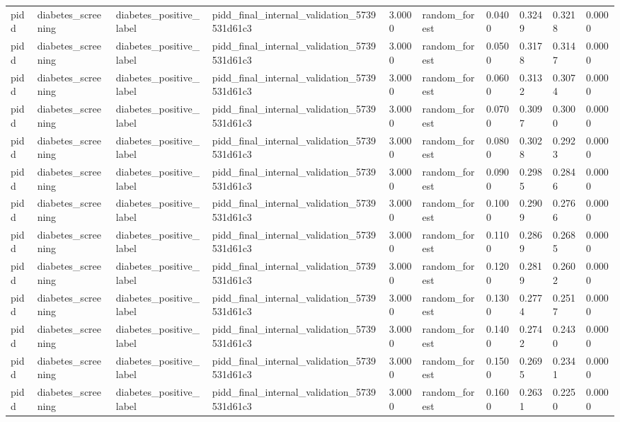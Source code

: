 \begin{tabular}{llllllllll}
pidd & diabetes\_screening & diabetes\_positive\_label & pidd\_final\_internal\_validation\_5739531d61c3 & 3.0000 & random\_forest & 0.0400 & 0.3249 & 0.3218 & 0.0000 \\
pidd & diabetes\_screening & diabetes\_positive\_label & pidd\_final\_internal\_validation\_5739531d61c3 & 3.0000 & random\_forest & 0.0500 & 0.3178 & 0.3147 & 0.0000 \\
pidd & diabetes\_screening & diabetes\_positive\_label & pidd\_final\_internal\_validation\_5739531d61c3 & 3.0000 & random\_forest & 0.0600 & 0.3132 & 0.3074 & 0.0000 \\
pidd & diabetes\_screening & diabetes\_positive\_label & pidd\_final\_internal\_validation\_5739531d61c3 & 3.0000 & random\_forest & 0.0700 & 0.3097 & 0.3000 & 0.0000 \\
pidd & diabetes\_screening & diabetes\_positive\_label & pidd\_final\_internal\_validation\_5739531d61c3 & 3.0000 & random\_forest & 0.0800 & 0.3028 & 0.2923 & 0.0000 \\
pidd & diabetes\_screening & diabetes\_positive\_label & pidd\_final\_internal\_validation\_5739531d61c3 & 3.0000 & random\_forest & 0.0900 & 0.2985 & 0.2846 & 0.0000 \\
pidd & diabetes\_screening & diabetes\_positive\_label & pidd\_final\_internal\_validation\_5739531d61c3 & 3.0000 & random\_forest & 0.1000 & 0.2909 & 0.2766 & 0.0000 \\
pidd & diabetes\_screening & diabetes\_positive\_label & pidd\_final\_internal\_validation\_5739531d61c3 & 3.0000 & random\_forest & 0.1100 & 0.2869 & 0.2685 & 0.0000 \\
pidd & diabetes\_screening & diabetes\_positive\_label & pidd\_final\_internal\_validation\_5739531d61c3 & 3.0000 & random\_forest & 0.1200 & 0.2819 & 0.2602 & 0.0000 \\
pidd & diabetes\_screening & diabetes\_positive\_label & pidd\_final\_internal\_validation\_5739531d61c3 & 3.0000 & random\_forest & 0.1300 & 0.2774 & 0.2517 & 0.0000 \\
pidd & diabetes\_screening & diabetes\_positive\_label & pidd\_final\_internal\_validation\_5739531d61c3 & 3.0000 & random\_forest & 0.1400 & 0.2742 & 0.2430 & 0.0000 \\
pidd & diabetes\_screening & diabetes\_positive\_label & pidd\_final\_internal\_validation\_5739531d61c3 & 3.0000 & random\_forest & 0.1500 & 0.2695 & 0.2341 & 0.0000 \\
pidd & diabetes\_screening & diabetes\_positive\_label & pidd\_final\_internal\_validation\_5739531d61c3 & 3.0000 & random\_forest & 0.1600 & 0.2631 & 0.2250 & 0.0000 \\

\end{tabular}
